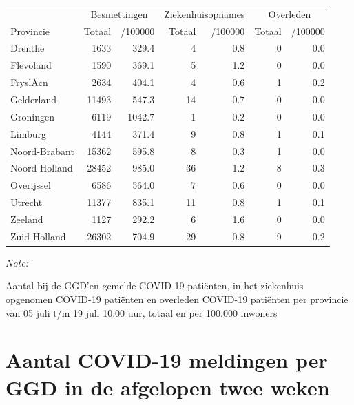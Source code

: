 \documentclass[
  english,
  man,floatsintext]{apa6}
\begin{document}
\begin{table}
\centering
\begin{threeparttable}
\begin{tabular}{lrrrrrr}
\toprule
\multicolumn{1}{c}{ } & \multicolumn{2}{c}{Besmettingen} & \multicolumn{2}{c}{Ziekenhuisopnames} & \multicolumn{2}{c}{Overleden} \\
\cmidrule(l{3pt}r{3pt}){2-3} \cmidrule(l{3pt}r{3pt}){4-5} \cmidrule(l{3pt}r{3pt}){6-7}
Provincie & Totaal & /100000 & Totaal & /100000 & Totaal & /100000\\
\midrule
Drenthe & 1633 & 329.4 & 4 & 0.8 & 0 & 0.0\\
Flevoland & 1590 & 369.1 & 5 & 1.2 & 0 & 0.0\\
FryslÃ¢n & 2634 & 404.1 & 4 & 0.6 & 1 & 0.2\\
Gelderland & 11493 & 547.3 & 14 & 0.7 & 0 & 0.0\\
Groningen & 6119 & 1042.7 & 1 & 0.2 & 0 & 0.0\\
Limburg & 4144 & 371.4 & 9 & 0.8 & 1 & 0.1\\
Noord-Brabant & 15362 & 595.8 & 8 & 0.3 & 1 & 0.0\\
Noord-Holland & 28452 & 985.0 & 36 & 1.2 & 8 & 0.3\\
Overijssel & 6586 & 564.0 & 7 & 0.6 & 0 & 0.0\\
Utrecht & 11377 & 835.1 & 11 & 0.8 & 1 & 0.1\\
Zeeland & 1127 & 292.2 & 6 & 1.6 & 0 & 0.0\\
Zuid-Holland & 26302 & 704.9 & 29 & 0.8 & 9 & 0.2\\
\bottomrule
\end{tabular}
\begin{tablenotes}
\item \textit{Note: } 
\item Aantal bij de GGD’en gemelde COVID-19 patiënten, in het ziekenhuis opgenomen COVID-19 patiënten en overleden COVID-19 patiënten per provincie van 05 juli t/m 19 juli 10:00 uur, totaal en per 100.000 inwoners
\end{tablenotes}
\end{threeparttable}
\end{table}

\newpage

\hypertarget{aantal-covid-19-meldingen-per-ggd-in-de-afgelopen-twee-weken}{%
\section{Aantal COVID-19 meldingen per GGD in de afgelopen twee weken}\label{aantal-covid-19-meldingen-per-ggd-in-de-afgelopen-twee-weken}}
\end{document}
